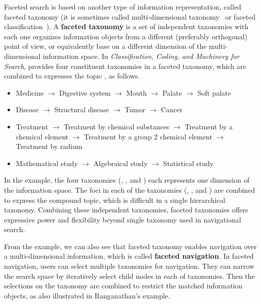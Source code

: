 Faceted search is based on another type of information representation, called faceted taxonomy (it is sometimes called multi-dimensional taxonomy~\cite{sacco2009dynamic} or faceted classification~\cite{tunkelang2009faceted}). A \textbf{faceted taxonomy} is a set of independent taxonomies with each one organizes information objects from a different (preferably orthogonal) point of view, or equivalently base on a different dimension of the multi-dimensional information space. In \textit{Classification, Coding, and Machinery for Search}, \citet{ranganathan1950classification} provides four constituent taxonomies in a faceted taxonomy, which are combined to expresses the topic , as follows.
\begin{itemize}
 \item Medicine $\rightarrow$ Digestive system $\rightarrow$ Mouth $\rightarrow$ Palate $\rightarrow$ Soft palate
\item Disease $\rightarrow$ Structural disease $\rightarrow$ Tumor $\rightarrow$ Cancer
\item Treatment $\rightarrow$ Treatment by chemical substances $\rightarrow$ Treatment by a chemical element  $\rightarrow$ Treatment by a group 2 chemical element $\rightarrow$ Treatment by radium
\item Mathematical study $\rightarrow$ Algebraical study $\rightarrow$ Statistical study
\end{itemize}
In the example, the four taxonomies (, ,  and ) each represents one dimension of the information space. The foci in each of the taxonomies (, ,  and ) are combined to express the compound topic, which is difficult in a single hierarchical taxonomy. Combining these independent taxonomies, faceted taxonomies offers expressive power and flexibility beyond single taxonomy used in navigational search. 

From the example, we can also see that faceted taxonomy enables navigation over a multi-dimensional information, which is called \textbf{faceted navigation}. In faceted navigation, users can select multiple taxonomies for navigation. They can narrow the search space by iteratively select child nodes in each of taxonomies. Then the selections on the taxonomy are combined to restrict the matched information objects, as also illustrated in Ranganathan's example. 


